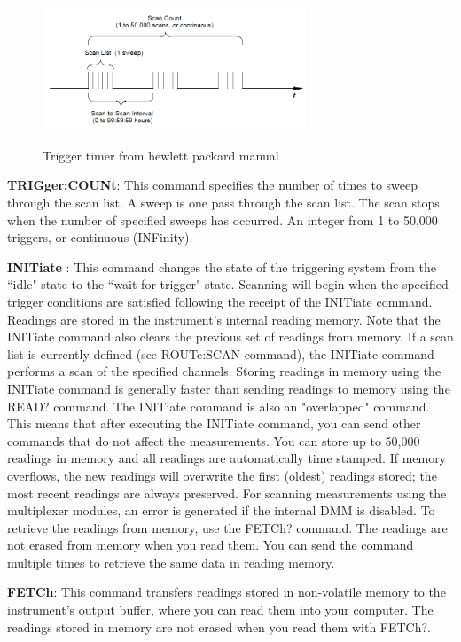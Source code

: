 \documentclass[a4paper]{article}
\begin{document}
\begin{figure}[h!]
	\centering
	\includegraphics[width=0.7\textwidth]{trigger_timer2.png}
	\label{fig:trigger_timer2}
	\caption{Trigger timer from hewlett packard manual}
\end{figure}



\textbf{TRIGger:COUNt}: This command specifies the number of times to sweep through the scan list. A sweep is one pass through the scan list. The scan stops when the number of specified sweeps has occurred. An integer from 1 to 50,000 triggers, or continuous (INFinity).

\textbf{INITiate} : This command changes the state of the triggering system from the ``idle" state to the ``wait-for-trigger" state. Scanning will begin when the specified trigger conditions are satisfied following the receipt of the INITiate command. Readings are stored in the instrument's internal reading memory. Note that the INITiate command also clears the previous set of readings from memory.
If a scan list is currently defined (see ROUTe:SCAN command), the INITiate command performs a scan of the specified channels.
Storing readings in memory using the INITiate command is generally faster than sending readings to memory using the READ? command. The INITiate command is also an "overlapped" command. This means that after executing the INITiate command, you can send other commands that do not affect the measurements.
You can store up to 50,000 readings in memory and all readings are automatically time stamped. If memory overflows, the new readings will overwrite the first (oldest) readings stored; the most recent readings are always preserved.
For scanning measurements using the multiplexer modules, an
error is generated if the internal DMM is disabled.
To retrieve the readings from memory, use the FETCh? command.
The readings are not erased from memory when you read them.
You can send the command multiple times to retrieve the same
data in reading memory.

\textbf{FETCh}: This command transfers readings stored in non-volatile memory to the instrument's output buffer, where you can read them into your computer. The readings stored in memory are not erased when you read them with FETCh?.
\end{document}
